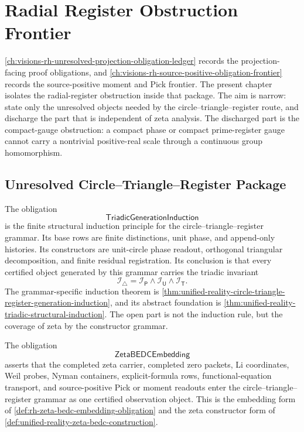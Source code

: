 \chapter{Radial Register Obstruction Frontier}
\label{ch:visions-rh-radial-register-obstruction-frontier}

\autoref{ch:visions-rh-unresolved-projection-obligation-ledger} records
the projection-facing proof obligations, and
\autoref{ch:visions-rh-source-positive-obligation-frontier} records the
source-positive moment and Pick frontier. The present chapter isolates
the radial-register obstruction inside that package. The aim is narrow:
state only the unresolved objects needed by the circle--triangle--register
route, and discharge the part that is independent of zeta analysis. The
discharged part is the compact-gauge obstruction: a compact phase or
compact prime-register gauge cannot carry a nontrivial positive-real
scale through a continuous group homomorphism.

\section{Unresolved Circle--Triangle--Register Package}
\label{sec:rh-radial-register-unresolved-package}

\begin{definition}[TriadicGenerationInduction]
\label{def:rh-triadic-generation-induction}
The obligation
$$
\mathsf{TriadicGenerationInduction}
$$
is the finite structural induction principle for the
circle--triangle--register grammar. Its base rows are finite
distinctions, unit phase, and append-only histories. Its constructors are
unit-circle phase readout, orthogonal triangular decomposition, and
finite residual registration. Its conclusion is that every certified
object generated by this grammar carries the triadic invariant
$$
\mathcal I_{\triangle}
=
\mathcal I_{\mathsf P}
\wedge
\mathcal I_{\mathsf U}
\wedge
\mathcal I_{\mathsf T}.
$$
The grammar-specific induction theorem is
\autoref{thm:unified-reality-circle-triangle-register-generation-induction},
and its abstract foundation is
\autoref{thm:unified-reality-triadic-structural-induction}. The open
part is not the induction rule, but the coverage of zeta by the
constructor grammar.
\end{definition}

\begin{definition}[ZetaBEDCEmbedding]
\label{def:rh-radial-zeta-bedc-embedding}
The obligation
$$
\mathsf{ZetaBEDCEmbedding}
$$
asserts that the completed zeta carrier, completed zero packets, Li
coordinates, Weil probes, Nyman containers, explicit-formula rows,
functional-equation transport, and source-positive Pick or moment
readouts enter the circle--triangle--register grammar as one certified
observation object. This is the embedding form of
\autoref{def:rh-zeta-bedc-embedding-obligation} and the zeta
constructor form of \autoref{def:unified-reality-zeta-bedc-construction}.
\end{definition}

